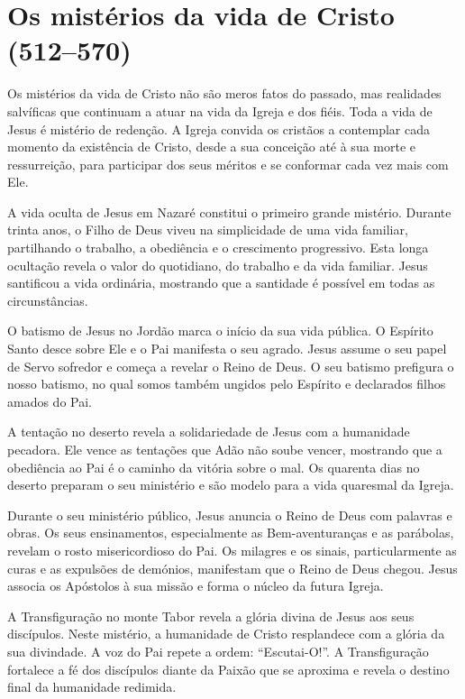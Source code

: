 \section{Os mistérios da vida de Cristo (512--570)}

Os mistérios da vida de Cristo não são meros fatos do passado, mas realidades salvíficas que continuam a atuar na vida da Igreja e dos fiéis. Toda a vida de Jesus é mistério de redenção. A Igreja convida os cristãos a contemplar cada momento da existência de Cristo, desde a sua conceição até à sua morte e ressurreição, para participar dos seus méritos e se conformar cada vez mais com Ele.

A vida oculta de Jesus em Nazaré constitui o primeiro grande mistério. Durante trinta anos, o Filho de Deus viveu na simplicidade de uma vida familiar, partilhando o trabalho, a obediência e o crescimento progressivo. Esta longa ocultação revela o valor do quotidiano, do trabalho e da vida familiar. Jesus santificou a vida ordinária, mostrando que a santidade é possível em todas as circunstâncias.

O batismo de Jesus no Jordão marca o início da sua vida pública. O Espírito Santo desce sobre Ele e o Pai manifesta o seu agrado. Jesus assume o seu papel de Servo sofredor e começa a revelar o Reino de Deus. O seu batismo prefigura o nosso batismo, no qual somos também ungidos pelo Espírito e declarados filhos amados do Pai.

A tentação no deserto revela a solidariedade de Jesus com a humanidade pecadora. Ele vence as tentações que Adão não soube vencer, mostrando que a obediência ao Pai é o caminho da vitória sobre o mal. Os quarenta dias no deserto preparam o seu ministério e são modelo para a vida quaresmal da Igreja.

Durante o seu ministério público, Jesus anuncia o Reino de Deus com palavras e obras. Os seus ensinamentos, especialmente as Bem-aventuranças e as parábolas, revelam o rosto misericordioso do Pai. Os milagres e os sinais, particularmente as curas e as expulsões de demónios, manifestam que o Reino de Deus chegou. Jesus associa os Apóstolos à sua missão e forma o núcleo da futura Igreja.

A Transfiguração no monte Tabor revela a glória divina de Jesus aos seus discípulos. Neste mistério, a humanidade de Cristo resplandece com a glória da sua divindade. A voz do Pai repete a ordem: ``Escutai-O!''. A Transfiguração fortalece a fé dos discípulos diante da Paixão que se aproxima e revela o destino final da humanidade redimida.

